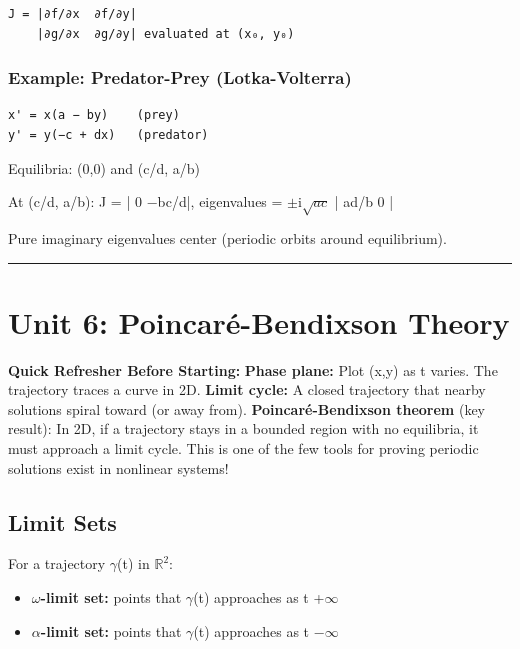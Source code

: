 \documentclass[12pt,a4paper,openany]{book}
\begin{document}
{{\begin{verbatim}
J = |∂f/∂x  ∂f/∂y|
    |∂g/∂x  ∂g/∂y| evaluated at (x₀, y₀)
\end{verbatim}

\subsubsection{Example: Predator-Prey (Lotka-Volterra)}
\begin{verbatim}
x' = x(a − by)    (prey)
y' = y(−c + dx)   (predator)
\end{verbatim}

Equilibria: (0,0) and (c/d, a/b)

At (c/d, a/b): J = |    0      −bc/d|, eigenvalues = $\pm$i$\sqrt{ac}$
                     |  ad/b      0  |

Pure imaginary eigenvalues  center (periodic orbits around equilibrium).

\bigskip\noindent\rule{\textwidth}{0.4pt}\bigskip

\section{Unit 6: Poincaré-Bendixson Theory }

\begin{prereqbox}
 \textbf{Quick Refresher Before Starting:}
\textbf{Phase plane:} Plot (x,y) as t varies. The trajectory traces a curve in 2D.
\textbf{Limit cycle:} A closed trajectory that nearby solutions spiral toward (or away from).
\textbf{Poincaré-Bendixson theorem} (key result): In 2D, if a trajectory stays in a bounded region with no equilibria, it must approach a limit cycle.
This is one of the few tools for proving periodic solutions exist in nonlinear systems!
\end{prereqbox}


\subsection{Limit Sets}

For a trajectory $\gamma$(t) in $\mathbb{R}^2$:
\begin{itemize}[leftmargin=*]
  \item \textbf{$\omega$-limit set:} points that $\gamma$(t) approaches as t  +$\infty$
  \item \textbf{$\alpha$-limit set:} points that $\gamma$(t) approaches as t  −$\infty$
\end{itemize}

}}
\end{document}
